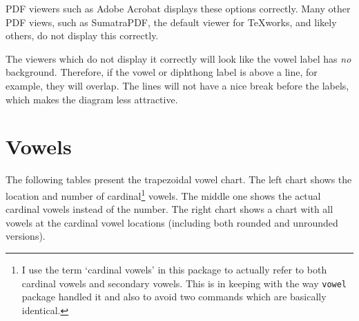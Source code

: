 \documentclass{article}
\newcommand{\pkg}[1]{\texttt{#1}}
\begin{document}
PDF viewers such as Adobe Acrobat displays these options correctly.  Many other PDF views, such as SumatraPDF, the default viewer for TeXworks, and likely others, do not display this correctly.

The viewers which do not display it correctly will look like the vowel label has \textit{no} background.  Therefore, if the vowel or diphthong label is above a line, for example, they will overlap.  The lines will not have a nice break before the labels, which makes the diagram less attractive.


\section{Vowels}
\label{sec:Vowels}

The following tables present the trapezoidal vowel chart.  The left chart shows the location and number of cardinal\footnote{I use the term `cardinal vowels' in this package to actually refer to both cardinal vowels and secondary vowels.  This is in keeping with the way \pkg{vowel} package handled it and also to avoid two commands which are basically identical.\label{footnote:cardinal vowel}} vowels.  The middle one shows the actual cardinal vowels instead of the number.  The right chart shows a chart with all vowels at the cardinal vowel locations (including both rounded and unrounded versions).
\end{document}
